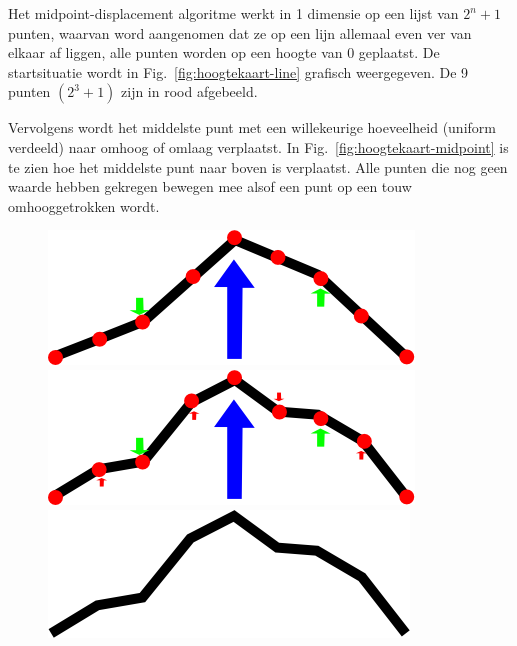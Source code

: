 \documentclass{article}
\begin{document}
Het midpoint-displacement algoritme werkt in 1 dimensie op een lijst van $2^n + 1$ punten, waarvan word aangenomen dat ze op een lijn allemaal even ver van elkaar af liggen, alle punten worden op een hoogte van 0 geplaatst. De startsituatie wordt in Fig.~\ref{fig:hoogtekaart-line} grafisch weergegeven. De 9 punten $(2^3 + 1)$ zijn in rood afgebeeld.

Vervolgens wordt het middelste punt met een willekeurige hoeveelheid (uniform verdeeld) naar omhoog of omlaag verplaatst. In Fig.~\ref{fig:hoogtekaart-midpoint} is te zien hoe het middelste punt naar boven is verplaatst. Alle punten die nog geen waarde hebben gekregen bewegen mee alsof een punt op een touw omhooggetrokken wordt.

\begin{figure}
  \centering
  \parbox{0.33\textwidth}{%
    \includegraphics[width=0.9\linewidth]{hoogtekaart-mountain1.png}%
    \caption{\cite{hoogtekaart-illustratie}}%
    \label{fig:hoogtekaart-mountain1}}%
  \parbox{0.33\textwidth}{%
    \includegraphics[width=0.9\linewidth]{hoogtekaart-mountain2.png}%
    \caption{\cite{hoogtekaart-illustratie}}%
    \label{fig:hoogtekaart-mountain2}}%
  \parbox{0.33\textwidth}{%
    \includegraphics[width=0.9\linewidth]{hoogtekaart-mountain3.png}%
    \caption{\cite{hoogtekaart-illustratie}}%
    \label{fig:hoogtekaart-mountain3}}%
\end{figure}
\end{document}
